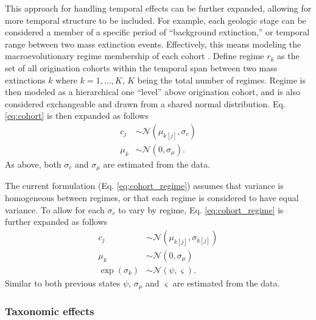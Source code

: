 \documentclass[12pt,letterpaper]{article}
\begin{document}
This approach for handling temporal effects can be further expanded, allowing for more temporal structure to be included. For example, each geologic stage can be considered a member of a specific period of ``background extinction,'' or temporal range between two mass extinction events. Effectively, this means modeling the macroevolutionary regime membership of each cohort \citep{Jablonski1987}. Define regime \(r_{k}\) as the set of all origination cohorts within the temporal span between two mass extinctions \(k\) where \(k = 1, \dots, K\), \(K\) being the total number of regimes. Regime is then modeled as a hierarchical one ``level'' above origination cohort, and is also considered exchangeable and drawn from a shared normal distribution. Eq. \ref{eq:cohort} is then expanded as follows
\begin{equation}
  \begin{aligned}
    c_{j} &\sim \mathcal{N}(\mu_{k[j]}, \sigma_{c}) \\
    \mu_{k} &\sim \mathcal{N}(0, \sigma_{\mu}).
  \end{aligned}
  \label{eq:cohort_regime}
\end{equation}
As above, both \(\sigma_{c}\) and \(\sigma_{\mu}\) are estimated from the data.

The current formulation (Eq. \ref{eq:cohort_regime}) assumes that variance is homogeneous between regimes, or that each regime is considered to have equal variance. To allow for each \(\sigma_{c}\) to vary by regime, Eq. \ref{eq:cohort_regime} is further expanded as follows
\begin{equation}
  \begin{aligned}
    c_{j} &\sim \mathcal{N}(\mu_{k[j]}, \sigma_{k[j]}) \\
    \mu_{k} &\sim \mathcal{N}(0, \sigma_{\mu}) \\
    \exp(\sigma_{k}) &\sim \mathcal{N}(\psi, \varsigma).
  \end{aligned}
  \label{eq:temporal_complex}
\end{equation}
Similar to both previous states \(\psi\), \(\sigma_{\mu}\) and \(\varsigma\) are estimated from the data.


\subsubsection{Taxonomic effects}
\end{document}
